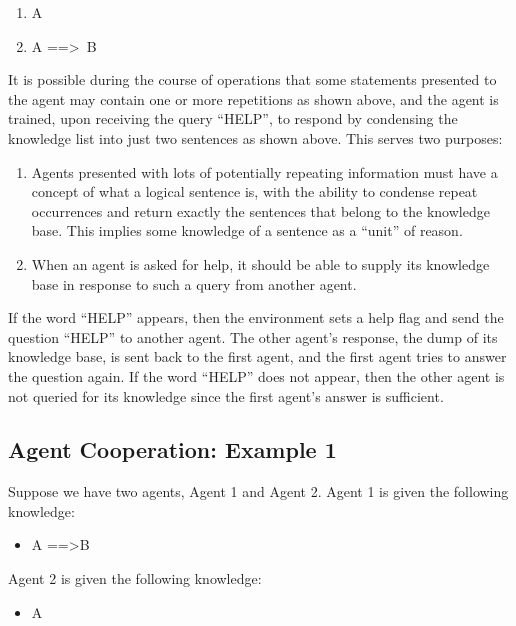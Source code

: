 \documentclass{article}
\begin{document}
\begin{enumerate}
	\item A
	\item A ==\textgreater \, B
\end{enumerate}

It is possible during the course of operations that some statements presented to the agent may contain one or more repetitions as shown above, and the agent is trained, upon receiving the query “HELP”, to respond by condensing the knowledge list into just two sentences as shown above. This serves two purposes:

\begin{enumerate}
	\item Agents presented with lots of potentially repeating information must have a concept of what a logical sentence is, with the ability to condense repeat occurrences and return exactly the sentences that belong to the knowledge base. This implies some knowledge of a sentence as a “unit” of reason.
	\item When an agent is asked for help, it should be able to supply its knowledge base in response to such a query from another agent.
\end{enumerate}

If the word “HELP” appears, then the environment sets a help flag and send the question “HELP” to another agent. The other agent’s response, the dump of its knowledge base, is sent back to the first agent, and the first agent tries to answer the question again. If the word “HELP” does not appear, then the other agent is not queried for its knowledge since the first agent's answer is sufficient.

\subsection{Agent Cooperation: Example 1}
\label{example_1}

Suppose we have two agents, Agent 1 and Agent 2. Agent 1 is given the following knowledge:

\begin{itemize}
	\item A ==\textgreater B
\end{itemize}

Agent 2 is given the following knowledge:

\begin{itemize}
	\item A
\end{itemize}
\end{document}
